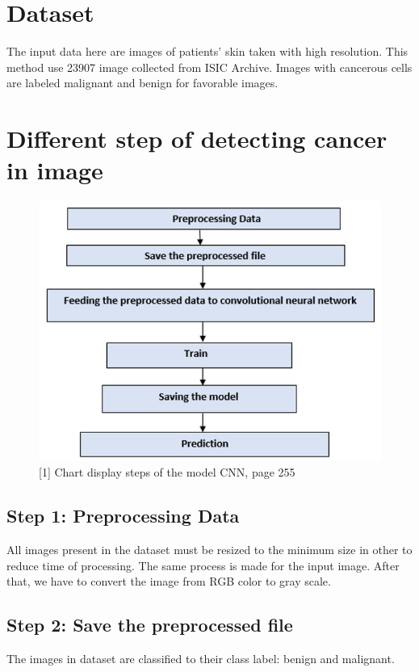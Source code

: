 \documentclass[12pt, letterpaper]{article}
\begin{document}
\section{Dataset}

\par The input data here are images of patients’ skin taken with high resolution. This method use 23907 image collected from ISIC Archive. Images with cancerous cells are labeled malignant and benign for favorable images.

\section{Different step of detecting cancer in image} 
\begin{figure}[H]
    \includegraphics[width=\linewidth]{images/steps.png}
    \caption{[1] Chart display steps of the model CNN, page 255}
    \label{fig:L1}
\end{figure}
\subsection{Step 1: Preprocessing Data}
\par All images present in the dataset must be resized to the minimum size in other to reduce time of processing. The same process is made for the input image. After that, we have to convert the image from RGB color to gray scale.

\subsection{Step 2: Save the preprocessed file}
\par The images in dataset are classified to their class label: benign and malignant.
\end{document}
